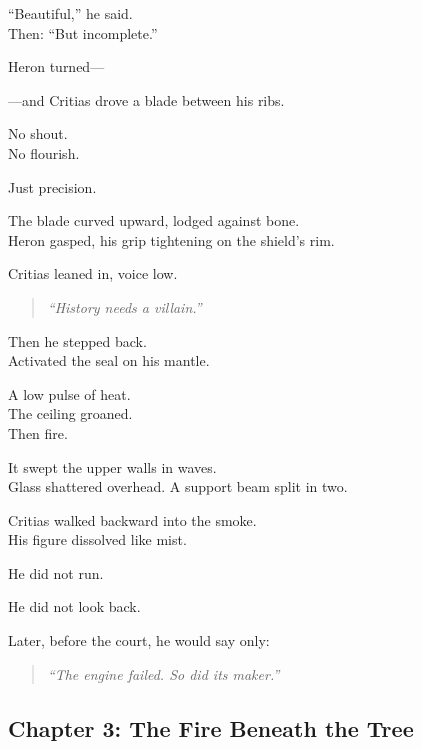 \documentclass[12pt]{article}
\begin{document}
“Beautiful,” he said.\\
Then: “But incomplete.”

Heron turned—

—and Critias drove a blade between his ribs.

\vspace{1em}

No shout.\\
No flourish.

Just precision.

The blade curved upward, lodged against bone.\\
Heron gasped, his grip tightening on the shield’s rim.

Critias leaned in, voice low.

\begin{quote}
\textit{“History needs a villain.”}
\end{quote}

Then he stepped back.\\
Activated the seal on his mantle.

\vspace{1em}

A low pulse of heat.\\
The ceiling groaned.\\
Then fire.

It swept the upper walls in waves.\\
Glass shattered overhead.  
A support beam split in two.

\vspace{1em}

Critias walked backward into the smoke.\\
His figure dissolved like mist.

He did not run.

He did not look back.

\vspace{1em}

Later, before the court, he would say only:

\begin{quote}
\textit{“The engine failed. So did its maker.”}
\end{quote}

\newpage

\subsection*{Chapter 3: The Fire Beneath the Tree}

\vspace{.5in}
\end{document}
